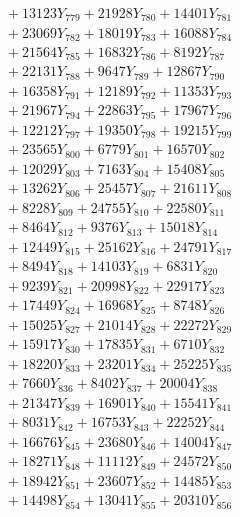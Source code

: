 \documentclass[a4paper,10pt]{article}
\begin{document}
{\begin{align}
&\;  + 13123 Y_{779} + 21928 Y_{780} + 14401 Y_{781} \\[0.3ex]
&\;  + 23069 Y_{782} + 18019 Y_{783} + 16088 Y_{784} \\[0.3ex]
&\;  + 21564 Y_{785} + 16832 Y_{786} + 8192 Y_{787} \\[0.3ex]
&\;  + 22131 Y_{788} + 9647 Y_{789} + 12867 Y_{790} \\[0.3ex]
&\;  + 16358 Y_{791} + 12189 Y_{792} + 11353 Y_{793} \\[0.3ex]
&\;  + 21967 Y_{794} + 22863 Y_{795} + 17967 Y_{796} \\[0.3ex]
&\;  + 12212 Y_{797} + 19350 Y_{798} + 19215 Y_{799} \\[0.3ex]
&\;  + 23565 Y_{800} + 6779 Y_{801} + 16570 Y_{802} \\[0.3ex]
&\;  + 12029 Y_{803} + 7163 Y_{804} + 15408 Y_{805} \\[0.3ex]
&\;  + 13262 Y_{806} + 25457 Y_{807} + 21611 Y_{808} \\[0.5ex]\allowbreak
&\;  + 8228 Y_{809} + 24755 Y_{810} + 22580 Y_{811} \\[0.3ex]
&\;  + 8464 Y_{812} + 9376 Y_{813} + 15018 Y_{814} \\[0.3ex]
&\;  + 12449 Y_{815} + 25162 Y_{816} + 24791 Y_{817} \\[0.3ex]
&\;  + 8494 Y_{818} + 14103 Y_{819} + 6831 Y_{820} \\[0.3ex]
&\;  + 9239 Y_{821} + 20998 Y_{822} + 22917 Y_{823} \\[0.3ex]
&\;  + 17449 Y_{824} + 16968 Y_{825} + 8748 Y_{826} \\[0.3ex]
&\;  + 15025 Y_{827} + 21014 Y_{828} + 22272 Y_{829} \\[0.3ex]
&\;  + 15917 Y_{830} + 17835 Y_{831} + 6710 Y_{832} \\[0.3ex]
&\;  + 18220 Y_{833} + 23201 Y_{834} + 25225 Y_{835} \\[0.3ex]
&\;  + 7660 Y_{836} + 8402 Y_{837} + 20004 Y_{838} \\[0.5ex]\allowbreak
&\;  + 21347 Y_{839} + 16901 Y_{840} + 15541 Y_{841} \\[0.3ex]
&\;  + 8031 Y_{842} + 16753 Y_{843} + 22252 Y_{844} \\[0.3ex]
&\;  + 16676 Y_{845} + 23680 Y_{846} + 14004 Y_{847} \\[0.3ex]
&\;  + 18271 Y_{848} + 11112 Y_{849} + 24572 Y_{850} \\[0.3ex]
&\;  + 18942 Y_{851} + 23607 Y_{852} + 14485 Y_{853} \\[0.3ex]
&\;  + 14498 Y_{854} + 13041 Y_{855} + 20310 Y_{856} \\[0.3ex]

\end{align}}
\end{document}
